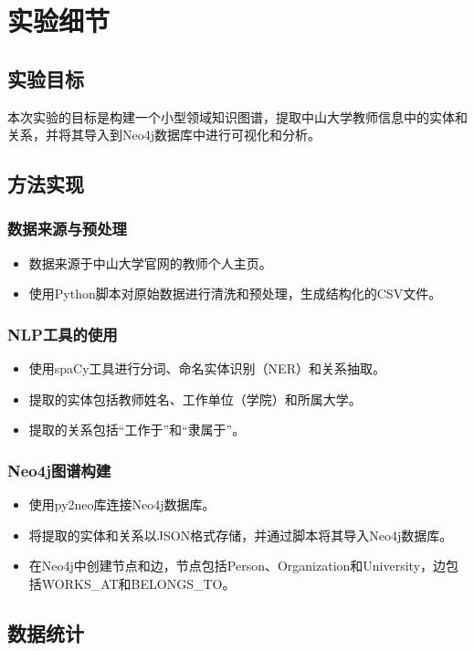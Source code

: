 \chapter{实验细节}

\section{实验目标}
本次实验的目标是构建一个小型领域知识图谱，提取中山大学教师信息中的实体和关系，并将其导入到Neo4j数据库中进行可视化和分析。

\section{方法实现}
\subsection{数据来源与预处理}
\begin{itemize}
    \item 数据来源于中山大学官网的教师个人主页。
    \item 使用Python脚本对原始数据进行清洗和预处理，生成结构化的CSV文件。
\end{itemize}

\subsection{NLP工具的使用}
\begin{itemize}
    \item 使用spaCy工具进行分词、命名实体识别（NER）和关系抽取。
    \item 提取的实体包括教师姓名、工作单位（学院）和所属大学。
    \item 提取的关系包括“工作于”和“隶属于”。
\end{itemize}

\subsection{Neo4j图谱构建}
\begin{itemize}
    \item 使用py2neo库连接Neo4j数据库。
    \item 将提取的实体和关系以JSON格式存储，并通过脚本将其导入Neo4j数据库。
    \item 在Neo4j中创建节点和边，节点包括Person、Organization和University，边包括WORKS\_AT和BELONGS\_TO。
\end{itemize}


\section{数据统计}

